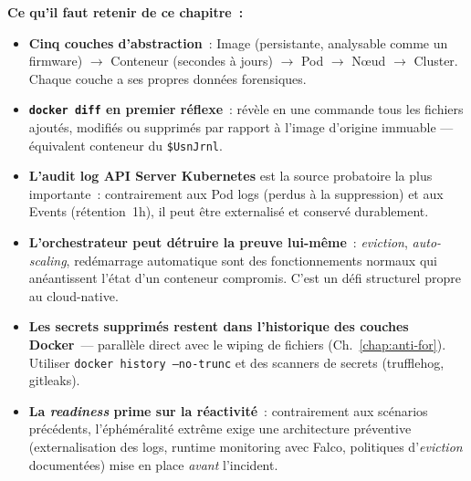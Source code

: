 \separateur

\begin{boxresume}
\textbf{Ce qu'il faut retenir de ce chapitre~:}
\begin{itemize}
    \item \textbf{Cinq couches d'abstraction}~: Image (persistante,
          analysable comme un firmware) $\to$ Conteneur (secondes
          à jours) $\to$ Pod $\to$ N\oe ud $\to$ Cluster. Chaque
          couche a ses propres données forensiques.

    \item \textbf{\texttt{docker diff} en premier réflexe}~: révèle
          en une commande tous les fichiers ajoutés, modifiés ou
          supprimés par rapport à l'image d'origine immuable
          --- équivalent conteneur du \texttt{\$UsnJrnl}.

    \item \textbf{L'audit log API Server Kubernetes} est la source
          probatoire la plus importante~: contrairement aux Pod logs
          (perdus à la suppression) et aux Events (rétention~1h),
          il peut être externalisé et conservé durablement.

    \item \textbf{L'orchestrateur peut détruire la preuve lui-même}~:
          \textit{eviction}, \textit{auto-scaling}, redémarrage
          automatique sont des fonctionnements normaux qui
          anéantissent l'état d'un conteneur compromis. C'est
          un défi structurel propre au cloud-native.

    \item \textbf{Les secrets supprimés restent dans l'historique
          des couches Docker}~--- parallèle direct avec le wiping
          de fichiers (Ch.~\ref{chap:anti-for}). Utiliser
          \texttt{docker history --no-trunc} et des scanners
          de secrets (trufflehog, gitleaks).

    \item \textbf{La \textit{readiness} prime sur la réactivité}~:
          contrairement aux scénarios précédents, l'éphéméralité
          extrême exige une architecture préventive (externalisation
          des logs, runtime monitoring avec Falco, politiques
          d'\textit{eviction} documentées) mise en place
          \emph{avant} l'incident.
\end{itemize}
\end{boxresume}

\bigskip

